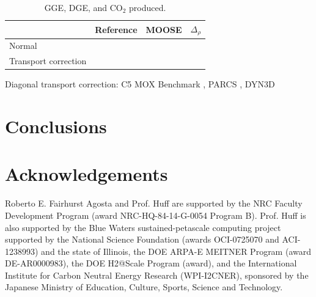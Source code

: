 \documentclass{anstrans}
\begin{document}
\begin{table}[]
	\centering
	\caption{\gls{GGE}, \gls{DGE}, and CO$_2$ produced.}
	\label{tab:meth}
	\begin{tabular}{llll}
	\toprule
							& Reference & MOOSE & $\Delta_{\rho}$ 	\\
	\midrule
	Normal 					&			&		&					\\
	Transport correction 	&			&		&					\\
	\bottomrule
	\end{tabular}
\end{table}


Diagonal transport correction:
C5 MOX Benchmark \cite{cavarec_benchmark_1994}, PARCS \cite{downar_parcs_2004}, DYN3D \cite{beckert_development_2007}

\section{Conclusions}



\section{Acknowledgements}

Roberto E. Fairhurst Agosta and Prof. Huff are supported by the \gls{NRC} Faculty Development Program (award NRC-HQ-84-14-G-0054 Program B).
Prof. Huff is also supported by the Blue Waters sustained-petascale computing project supported by the National Science Foundation (awards OCI-0725070 and ACI-1238993) and the state of Illinois, the DOE ARPA-E MEITNER Program (award DE-AR0000983), the DOE H2@Scale Program (award), and the International Institute for Carbon Neutral Energy Research (WPI-I2CNER), sponsored by the Japanese Ministry of Education, Culture, Sports, Science and Technology.



\end{document}
